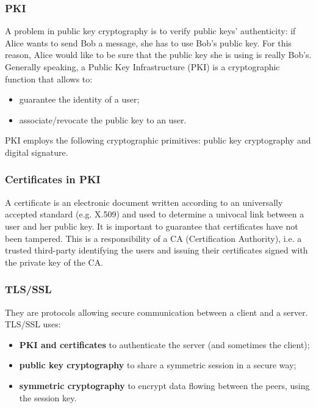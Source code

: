 \documentclass[a4paper, 10pt, titlepage]{article}
\begin{document}
\subsubsection{PKI}
A problem in public key cryptography is to verify public keys' authenticity: if Alice wants to send Bob a message, she has to use Bob's public key. For this reason, Alice would like to be sure that the public key she is using is really Bob's. Generally speaking, a Public Key Infrastructure (PKI) is a cryptographic function that allows to:
\begin{itemize}
\item guarantee the identity of a user;
\item associate/revocate the public key to an user.
\end{itemize}
PKI employs the following cryptographic primitives: public key cryptography and digital signature. 

\subsubsection*{Certificates in PKI}
A certificate is an electronic document written according to an universally accepted standard (e.g. X.509) and used to determine a univocal link between a user and her public key. It is important to guarantee that certificates have not been tampered. This is a responsibility of a CA (Certification Authority), i.e. a trusted third-party identifying the users and issuing their certificates signed with the private key of the CA.

\subsubsection{TLS/SSL}
They are protocols allowing secure communication between a client and a server. TLS/SSL uses:
\begin{itemize}
\item \textbf{PKI and certificates} to authenticate the server (and sometimes the client);
\item \textbf{public key cryptography} to share a symmetric session in a secure way;
\item \textbf{symmetric cryptography} to encrypt data flowing between the peers, using the session key.
\end{itemize}
\end{document}

